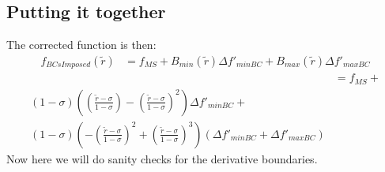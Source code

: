 \documentclass[a4paper]{article}
\begin{document}
\subsection{Putting it together}

The corrected function is then: 
\begin{align*}
    f_{BCsImposed} \left( \widetilde{r} \right) &= 
    f_{MS} + 
    B_{min}\left( \widetilde{r} \right) \Delta f'_{minBC} +
    B_{max}\left( \widetilde{r} \right) \Delta f'_{maxBC}
\end{align*}
\begin{align*}
    &= 
    f_{MS} + \\
    \left( 1 - \sigma \right) \left( 
        \left( \frac{\widetilde{r} - \sigma}{1 - \sigma} \right) 
        - \left( \frac{\widetilde{r} - \sigma}{1 - \sigma} \right) ^2
\right) \Delta f'_{minBC} + \\
\left( 1 - \sigma \right) \left( - \left( \frac{\widetilde{r} - \sigma}{1 - \sigma} \right)^2 + 
    \left( \frac{\widetilde{r} - \sigma}{1 - \sigma}  \right)^3
\right)
\left( \Delta f'_{minBC} + \Delta f'_{maxBC} \right) 
\end{align*}
%
Now here we will do sanity checks for the derivative boundaries.
%
%
%
%
%
%
%
%
\end{document}

